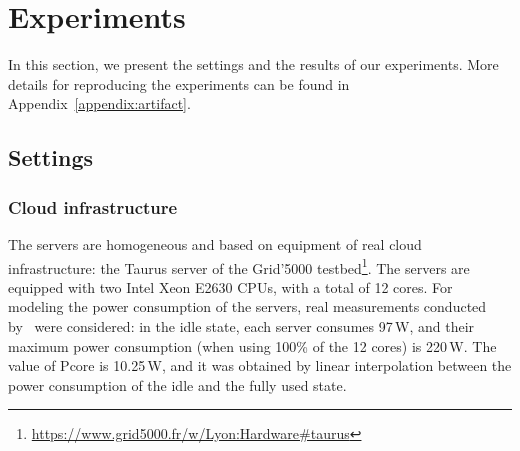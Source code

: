 %

\section{Experiments}
\label{sec:experiments_ccgrid}



 In this section, we present the settings and the results of our experiments. 
More details for reproducing the experiments can be found in Appendix~\ref{appendix:artifact}.





\subsection{Settings}


\label{sec:settings_ccgrid}


\subsubsection{Cloud infrastructure}

The servers are homogeneous and based on equipment of real cloud infrastructure: the Taurus server of the Grid'5000 testbed\footnote{\url{https://www.grid5000.fr/w/Lyon:Hardware\#taurus}}. The servers are equipped with two Intel Xeon E2630 CPUs, with a total of 12 cores. For modeling the power consumption of the servers, real measurements conducted by~\cite{ahvar22_estimating_cloud_cons} were considered: in the idle state, each server consumes 97\,W, and their maximum power consumption (when using 100\% of the 12 cores) is 220\,W. The value of Pcore is 10.25\,W, and it was obtained by linear interpolation between the power consumption of the idle and the fully used state.

